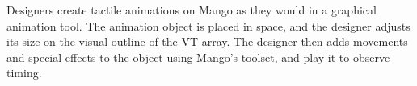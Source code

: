 Designers create tactile animations on Mango as they would in a graphical animation tool. %
The animation object is placed in space, and the designer adjusts %
its size on the visual outline of the VT array. %
The designer then adds movements and special effects to the object using Mango's toolset,
and play it to observe timing. %

